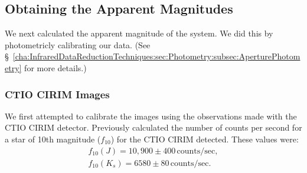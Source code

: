 
\subsection{Obtaining the Apparent Magnitudes}
\label{cha:lightcurve:sec:Photometry:subsec:PhotometricCalibration}

We next calculated the apparent magnitude of the system. We did this by photometricly calibrating our data. (See \S~\vref{cha:InfraredDataReductionTechniques:sec:Photometry:subsec:AperturePhotometry} for more details.) %


\subsubsection{CTIO CIRIM Images}
\label{cha:lightcurve:sec:Photometry:subsec:PhotometricCalibration:subsubsec:ctio}

We first attempted to calibrate the images using the observations made
with the CTIO CIRIM detector. Previously  calculated the number of counts per second for a star of 10th magnitude ($f_{10}$) for the CTIO CIRIM detected. These values were:%
\begin{eqnarray}
\label{cha:lightcurve:sec:Photometry:subsec:PhotometricCalibration:subsubsec:ctio:eqn:f10}
f_{10}(J) = 10,900\pm400\,\mathrm{counts/sec},\\\nonumber
f_{10}(K_s) = 6580\pm80\,\mathrm{counts/sec}.
\end{eqnarray} %

